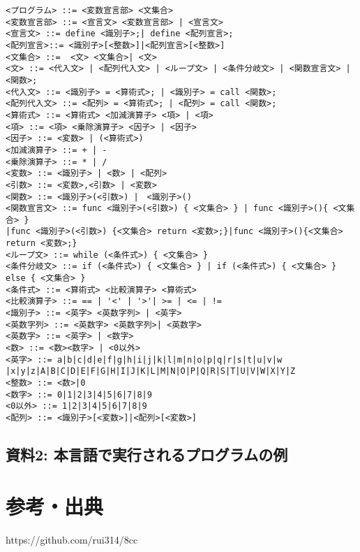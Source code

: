 \documentclass[11pt,a4j]{jarticle}
\begin{document}
{\baselineskip 2mm
\begin{verbatim}
<プログラム> ::= <変数宣言部> <文集合>
<変数宣言部> ::= <宣言文> <変数宣言部> | <宣言文>
<宣言文> ::= define <識別子>;| define <配列宣言>;
<配列宣言>::= <識別子>[<整数>]|<配列宣言>[<整数>]
<文集合> ::=  <文> <文集合>| <文>
<文> ::= <代入文> | <配列代入文> | <ループ文> | <条件分岐文> | <関数宣言文> | <関数>;
<代入文> ::= <識別子> = <算術式>; | <識別子> = call <関数>; 
<配列代入文> ::= <配列> = <算術式>; | <配列> = call <関数>;
<算術式> ::= <算術式> <加減演算子> <項> | <項>
<項> ::= <項> <乗除演算子> <因子> | <因子>
<因子> ::= <変数> | (<算術式>)
<加減演算子> ::= + | -
<乗除演算子> ::= * | /
<変数> ::= <識別子> | <数> | <配列>
<引数> ::= <変数>,<引数> | <変数>
<関数> ::= <識別子>(<引数>) |　<識別子>()
<関数宣言文> ::= func <識別子>(<引数>) { <文集合> } | func <識別子>(){ <文集合> }
|func <識別子>(<引数>) {<文集合> return <変数>;}|func <識別子>(){<文集合> return <変数>;}
<ループ文> ::= while (<条件式>) { <文集合> }
<条件分岐文> ::= if (<条件式>) { <文集合> } | if (<条件式>) { <文集合> } else { <文集合> }
<条件式> ::= <算術式> <比較演算子> <算術式>
<比較演算子> ::= == | '<' | '>'| >= | <= | !=
<識別子> ::= <英字> <英数字列> | <英字>
<英数字列> ::= <英数字> <英数字列>| <英数字>
<英数字> ::= <英字> | <数字>
<数> ::= <数><数字> | <0以外>
<英字> ::= a|b|c|d|e|f|g|h|i|j|k|l|m|n|o|p|q|r|s|t|u|v|w
|x|y|z|A|B|C|D|E|F|G|H|I|J|K|L|M|N|O|P|Q|R|S|T|U|V|W|X|Y|Z
<整数> ::= <数>|0
<数字> ::= 0|1|2|3|4|5|6|7|8|9
<0以外> ::= 1|2|3|4|5|6|7|8|9
<配列> ::= <識別子>[<変数>]|<配列>[<変数>]
\end{verbatim}}


\subsection{資料2: 本言語で実行されるプログラムの例}






\section{参考・出典}


https://github.com/rui314/8cc
\end{document}
